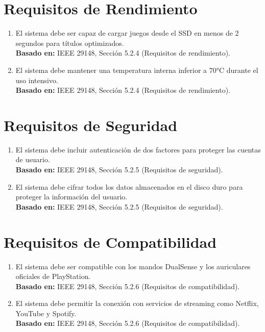 \documentclass{article}
\begin{document}
\section{Requisitos de Rendimiento}
\begin{enumerate}[label=RP-\arabic*]
    \item El sistema debe ser capaz de cargar juegos desde el SSD en menos de 2 segundos para títulos optimizados. \\
    \textbf{Basado en:} IEEE 29148, Sección 5.2.4 (Requisitos de rendimiento).
    
    \item El sistema debe mantener una temperatura interna inferior a 70°C durante el uso intensivo. \\
    \textbf{Basado en:} IEEE 29148, Sección 5.2.4 (Requisitos de rendimiento).
\end{enumerate}

\section{Requisitos de Seguridad}
\begin{enumerate}[label=RS-\arabic*]
    \item El sistema debe incluir autenticación de dos factores para proteger las cuentas de usuario. \\
    \textbf{Basado en:} IEEE 29148, Sección 5.2.5 (Requisitos de seguridad).
    
    \item El sistema debe cifrar todos los datos almacenados en el disco duro para proteger la información del usuario. \\
    \textbf{Basado en:} IEEE 29148, Sección 5.2.5 (Requisitos de seguridad).
\end{enumerate}

\section{Requisitos de Compatibilidad}
\begin{enumerate}[label=RC-\arabic*]
    \item El sistema debe ser compatible con los mandos DualSense y los auriculares oficiales de PlayStation. \\
    \textbf{Basado en:} IEEE 29148, Sección 5.2.6 (Requisitos de compatibilidad).
    
    \item El sistema debe permitir la conexión con servicios de streaming como Netflix, YouTube y Spotify. \\
    \textbf{Basado en:} IEEE 29148, Sección 5.2.6 (Requisitos de compatibilidad).
\end{enumerate}
\end{document}
